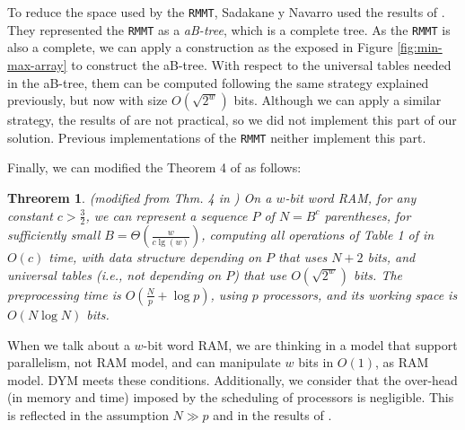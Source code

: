 To reduce the space used by the {\tt RMMT}, Sadakane y Navarro used the results of \cite{Patrascu:2008:SUC:1470582.1470670}. They represented the {\tt RMMT} as a \emph{aB-tree}, which is a complete tree. As the {\tt RMMT} is also a complete, we can apply a construction as the exposed in Figure \ref{fig:min-max-array} to construct the aB-tree. With respect to the universal tables needed in the aB-tree, them can be computed following the same strategy explained previously, but now with size $O(\sqrt{2^{w}})$ bits. Although we can apply a similar strategy, the results of \cite{Patrascu:2008:SUC:1470582.1470670} are not practical, so we did not implement this part of our solution. Previous implementations of the {\tt RMMT} neither implement this part.

Finally, we can modified the Theorem 4 of \cite{Navarro:2014:FFS:2620785.2601073} as follows:
			
\newtheorem{theorem}{Threorem}
\begin{theorem}
	 {\sc (modified from Thm. 4 in \cite{Navarro:2014:FFS:2620785.2601073})} On a $w$-bit word RAM, for any constant $c>\frac{3}{2}$, we can represent a sequence $P$ of $N=B^{c}$ parentheses, for sufficiently small $B=\Theta(\frac{w}{c\lg(w)})$, computing all operations of Table 1 of \cite{Navarro:2014:FFS:2620785.2601073} in $O(c)$ time, with data structure depending on $P$ that uses $N+2$ bits, and universal tables (i.e., not depending on $P$) that use $O(\sqrt{2^{w}})$ bits. The preprocessing time is $O(\frac{N}{p} + \log p)$, using $p$ processors, and its working space is $O(N\log N)$ bits.
\end{theorem}
				
	When we talk about a $w$-bit word RAM, we are thinking in a model that support parallelism, not RAM model, and can manipulate $w$ bits in $O(1)$, as RAM model. DYM meets these conditions. Additionally, we consider that the over-head (in memory and time) imposed by the scheduling of processors is negligible. This is reflected in the assumption $ N\gg p$ and in the results of \cite{Blumofe:1999:SMC:324133.324234}.





